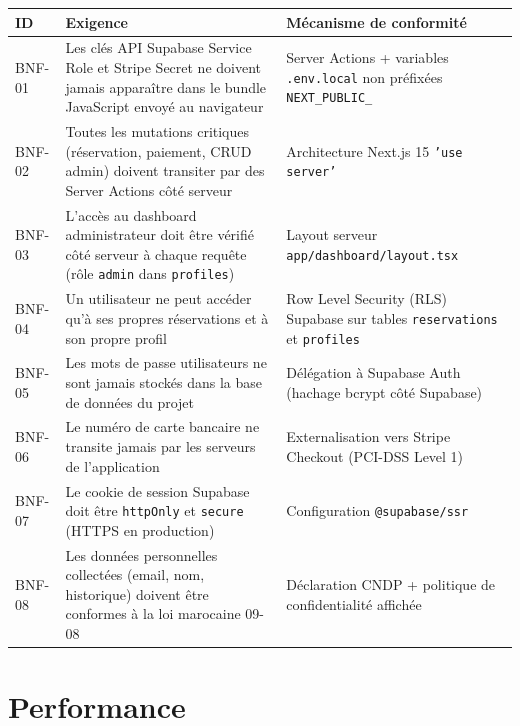 \documentclass[12pt,a4paper,openany]{report}
\begin{document}
\begin{longtable}{p{1.2cm}p{8cm}p{3.5cm}}
  \toprule
  \textbf{ID} & \textbf{Exigence} & \textbf{Mécanisme de conformité} \\
  \midrule
  \endhead
  \bottomrule
  \endfoot

  BNF-01 & Les clés API Supabase Service Role et Stripe Secret ne doivent jamais apparaître dans le bundle JavaScript envoyé au navigateur & Server Actions + variables \texttt{.env.local} non préfixées \texttt{NEXT\_PUBLIC\_} \\[4pt]

  BNF-02 & Toutes les mutations critiques (réservation, paiement, CRUD admin) doivent transiter par des Server Actions côté serveur & Architecture Next.js 15 \texttt{'use server'} \\[4pt]

  BNF-03 & L'accès au dashboard administrateur doit être vérifié côté serveur à chaque requête (rôle \texttt{admin} dans \texttt{profiles}) & Layout serveur \texttt{app/dashboard/layout.tsx} \\[4pt]

  BNF-04 & Un utilisateur ne peut accéder qu'à ses propres réservations et à son propre profil & Row Level Security (RLS) Supabase sur tables \texttt{reservations} et \texttt{profiles} \\[4pt]

  BNF-05 & Les mots de passe utilisateurs ne sont jamais stockés dans la base de données du projet & Délégation à Supabase Auth (hachage bcrypt côté Supabase) \\[4pt]

  BNF-06 & Le numéro de carte bancaire ne transite jamais par les serveurs de l'application & Externalisation vers Stripe Checkout (PCI-DSS Level 1) \\[4pt]

  BNF-07 & Le cookie de session Supabase doit être \texttt{httpOnly} et \texttt{secure} (HTTPS en production) & Configuration \texttt{@supabase/ssr} \\[4pt]

  BNF-08 & Les données personnelles collectées (email, nom, historique) doivent être conformes à la loi marocaine 09-08 & Déclaration CNDP + politique de confidentialité affichée \\
\end{longtable}

\section{Performance}
\end{document}
